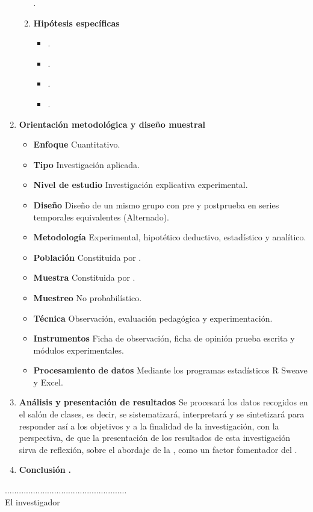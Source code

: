 \documentclass[12pt,a4paper]{article}
\begin{document}
\begin{enumerate}
\begin{enumerate}
		\hipotesis.
		\item \textbf{Hipótesis específicas}
		\begin{itemize}
			\item \hipotesise. 
			\item \hipotesisee. 
			\item \hipotesiseee. 
			\item \hipotesiseeee. 
		\end{itemize}
	\end{enumerate}
	\item \textbf{Orientación metodológica y diseño muestral}
	\begin{itemize}
		\item \textbf{Enfoque} Cuantitativo. 
		\item \textbf{Tipo} Investigación aplicada. 
		\item \textbf{Nivel de estudio} Investigación explicativa experimental. 
		\item \textbf{Diseño} Diseño \MakeTextLowercase{\diseno} de un mismo grupo
		con pre y postprueba en series temporales equivalentes (Alternado). 
		\item \textbf{Metodología} Experimental, hipotético deductivo, estadístico
		y analítico. 
		\item \textbf{Población} Constituida por \poblacion. 
		\item \textbf{Muestra} Constituida por \muestra. 
		\item \textbf{Muestreo} No probabilístico. 
		\item \textbf{Técnica} Observación, evaluación pedagógica y experimentación. 
		\item \textbf{Instrumentos} Ficha de observación, ficha de opinión prueba
		escrita y módulos experimentales. 
		\item \textbf{Procesamiento} \textbf{de datos} Mediante los programas estadísticos R Sweave y Excel. 
	\end{itemize}
	\item \textbf{Análisis y presentación de resultados} Se procesará los datos
	recogidos en el salón de clases, es decir, se sistematizará, interpretará
	y se sintetizará para responder así a los objetivos y a la finalidad
	de la investigación, con la perspectiva, de que la presentación de
	los resultados de esta investigación sirva de reflexión, sobre el
	abordaje de la \MakeTextLowercase{\variablei}, como un factor
	fomentador del \MakeTextLowercase{\variabled}.
	\item \textbf{Conclusión }\hipotesis\textbf{.}
\end{enumerate}
\textbf{\vspace{0.5cm}
}
\begin{center}
	....................................................\\
	El investigador 
\end{center}
\end{document}
